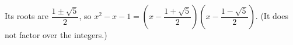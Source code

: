 Its roots are $\dfrac{1\pm\sqrt5}{2}$, so $x^2-x-1=\boxed{\left(x-\dfrac{1+\sqrt5}{2}\right)\left(x-\dfrac{1-\sqrt5}{2}\right)}$. (It does not factor over the integers.)
